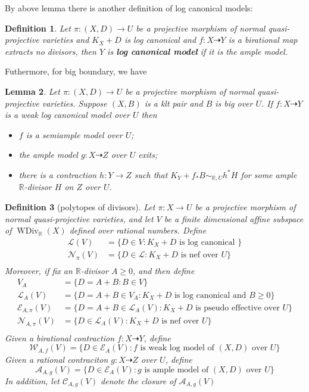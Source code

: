 \documentclass{article}
\newtheorem{defn}{Definition}[subsection]
\newtheorem{lem}[defn]{Lemma}
\begin{document}
By above lemma there is another definition of log canonical models:
\begin{defn}
  Let $ \pi:(X,D)\to U $ be a projective morphism of normal quasi-projective varieties and $ K_X+D $ is log canonical and $ f:X\dashrightarrow Y $ is a birational map extracts no divisors, then $ Y $ is \textbf{ log canonical model} if it is the ample model. 
\end{defn}
Futhermore, for big boundary, we have
\begin{lem}\cite[Lemma 3.9.3]{birkarExistenceMinimalModels2009}Let $ \pi:(X,D)\to U $ be a projective morphism of normal quasi-projective varieties. Suppose $(X,B)$ is a klt pair and  $B$ is big over $U$. If $f:X\dashrightarrow Y$ is a weak log canonical model over $U$ then
  \begin{itemize}
    \item $f$ is a semiample model over $U$;
      \item  the ample model $g:X \dashrightarrow Z$ over $U$ exits;
        \item  there is a contraction $h:Y\to Z$ such that $K_{Y}+f_*B\sim_{\mathbb{R},U} h^*H$ for some ample $\mathbb{R}$-divisor $H$ on $Z$ over $U$.   
  \end{itemize}
\end{lem}
\begin{defn}[polytopes of divisors]\label{polytopeofdivisor}
  Let $ \pi:X\to U $ be a projective morphism of normal quasi-projective varieties, and  let $ V $ be a finite dimensional affine subspace of $ \operatorname{WDiv}_{\mathbb{R}}(X) $ defined over rational numbers. Define
  \[
    \begin{aligned}
      \mathcal{L}(V)&=\{D\in V: K_X+D \text{ is log canonical }\} \\
      \mathcal{N}_\pi(V)&=\{D\in\mathcal{L}:K_X+D \text{ is nef over } U\}\\
    \end{aligned}
  \]
  Moreover, if fix an $ \mathbb{R} $-divisor $ A\geqslant 0 $, and then define
  \[
    \begin{aligned}
      V_A&=\{D=A+B:B\in V\}\\
      \mathcal{L}_A(V)&=\{D=A+B\in V_A: K_X+D \text{ is log canonical and  } B\geqslant0 \}\\
      \mathcal{E}_{A,\pi}(V)&=\{D=A+B\in \mathcal{L}_A(V): K_X+D \text{ is pseudo effective over } U\}\\ 
      \mathcal{N}_{A,\pi}(V)&=\{D\in\mathcal{L}_A(V):K_X+D \text{ is nef over } U\}\\
    \end{aligned}
  \]
  Given a birational contraction $ f:X \dashrightarrow Y $, define
  \[ \mathcal{W}_{A,f}(V)=\{D\in \mathcal{E}_{A}(V): f \text{ is weak log model of  } (X,D) \text{ over }U\} \]
  Given a rational contraciton $g:X\dashrightarrow Z  $ over $ U $, define
  \[ \mathcal{A}_{A,g}(V)=\{D\in \mathcal{E}_{A}(V): g \text{ is ample model of  } (X,D) \text{ over }U\} \]
  In addition, let $ \mathcal{C}_{A,g}(V) $ denote the closure of $ \mathcal{A}_{A,g}(V) $
\end{defn}
\end{document}
